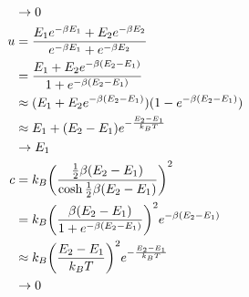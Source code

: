 \documentclass[uplatex,dvipdfmx,a4paper,11pt]{jlreq}
\theoremstyle{definition}
\begin{document}
\begin{align}
    & \to 0                                                                                                                                       \\
  u & = \frac{E_1e^{-\beta E_1} + E_2e^{-\beta E_2}}{e^{-\beta E_1} + e^{-\beta E_2}}                                                             \\
    & = \frac{E_1 + E_2e^{-\beta (E_2 - E_1)}}{1 + e^{-\beta (E_2 - E_1)}}                                                                        \\
    & \approx (E_1 + E_2e^{-\beta (E_2 - E_1)})(1 - e^{-\beta (E_2 - E_1)})                                                                       \\
    & \approx E_1 + (E_2 - E_1)e^{- \frac{E_2 - E_1}{k_BT}}                                                                                       \\
    & \to E_1                                                                                                                                     \\
  c & = k_B\qty(\frac{\frac{1}{2}\beta(E_2 - E_1)}{\cosh\frac{1}{2}\beta(E_2 - E_1)})^2                                                           \\
    & = k_B\qty(\frac{\beta(E_2 - E_1)}{1 + e^{-\beta(E_2 - E_1)}})^2e^{-\beta(E_2 - E_1)}                                                        \\
    & \approx k_B\qty(\frac{E_2 - E_1}{k_BT})^2e^{-\frac{E_2 - E_1}{k_BT}}                                                                        \\
    & \to 0
\end{align}
\end{document}
